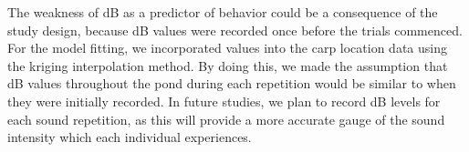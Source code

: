 \documentclass[12pt]{article}
\begin{document}
	The weakness of dB as a predictor of behavior could be a consequence of the study design, because dB values were recorded once before the trials commenced. For the model fitting, we incorporated values into the carp location data using the kriging interpolation method. By doing this, we made the assumption that dB values throughout the pond during each repetition would be similar to when they were initially recorded. In future studies, we plan to record dB levels for each sound repetition, as this will provide a more accurate gauge of the sound intensity which each individual experiences.
	
	
	
	
\end{document}
